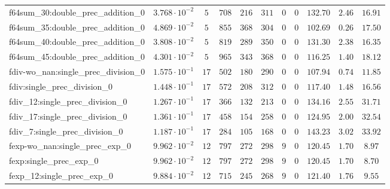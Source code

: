 \begin{tabular}{|l|c|c|c|c|c|c|c|c|c|c|}
f64sum\_30:double\_prec\_addition\_0           & $ 3.768 \cdot 10^{-2} $ & $ 5      $ & $ 708    $ & $ 216   $ & $ 311   $ & $ 0   $ & $ 0 $ & $ 132.70      $ & $ 2.46    $ & $ 16.91   $ \\
f64sum\_35:double\_prec\_addition\_0           & $ 4.869 \cdot 10^{-2} $ & $ 5      $ & $ 855    $ & $ 368   $ & $ 304   $ & $ 0   $ & $ 0 $ & $ 102.69      $ & $ 0.26    $ & $ 17.50   $ \\
f64sum\_40:double\_prec\_addition\_0           & $ 3.808 \cdot 10^{-2} $ & $ 5      $ & $ 819    $ & $ 289   $ & $ 350   $ & $ 0   $ & $ 0 $ & $ 131.30      $ & $ 2.38    $ & $ 16.35   $ \\
f64sum\_45:double\_prec\_addition\_0           & $ 4.301 \cdot 10^{-2} $ & $ 5      $ & $ 965    $ & $ 343   $ & $ 368   $ & $ 0   $ & $ 0 $ & $ 116.25      $ & $ 1.40    $ & $ 18.12   $ \\
fdiv-wo\_nan:single\_prec\_division\_0         & $ 1.575 \cdot 10^{-1} $ & $ 17     $ & $ 502    $ & $ 180   $ & $ 290   $ & $ 0   $ & $ 0 $ & $ 107.94      $ & $ 0.74    $ & $ 11.85   $ \\
fdiv:single\_prec\_division\_0                 & $ 1.448 \cdot 10^{-1} $ & $ 17     $ & $ 572    $ & $ 208   $ & $ 312   $ & $ 0   $ & $ 0 $ & $ 117.40      $ & $ 1.48    $ & $ 16.56   $ \\
fdiv\_12:single\_prec\_division\_0             & $ 1.267 \cdot 10^{-1} $ & $ 17     $ & $ 366    $ & $ 132   $ & $ 213   $ & $ 0   $ & $ 0 $ & $ 134.16      $ & $ 2.55    $ & $ 31.71   $ \\
fdiv\_17:single\_prec\_division\_0             & $ 1.361 \cdot 10^{-1} $ & $ 17     $ & $ 458    $ & $ 154   $ & $ 258   $ & $ 0   $ & $ 0 $ & $ 124.95      $ & $ 2.00    $ & $ 32.54   $ \\
fdiv\_7:single\_prec\_division\_0              & $ 1.187 \cdot 10^{-1} $ & $ 17     $ & $ 284    $ & $ 105   $ & $ 168   $ & $ 0   $ & $ 0 $ & $ 143.23      $ & $ 3.02    $ & $ 33.92   $ \\
fexp-wo\_nan:single\_prec\_exp\_0              & $ 9.962 \cdot 10^{-2} $ & $ 12     $ & $ 797    $ & $ 272   $ & $ 298   $ & $ 9   $ & $ 0 $ & $ 120.45      $ & $ 1.70    $ & $ 8.97    $ \\
fexp:single\_prec\_exp\_0                      & $ 9.962 \cdot 10^{-2} $ & $ 12     $ & $ 797    $ & $ 272   $ & $ 298   $ & $ 9   $ & $ 0 $ & $ 120.45      $ & $ 1.70    $ & $ 8.70    $ \\
fexp\_12:single\_prec\_exp\_0                  & $ 9.884 \cdot 10^{-2} $ & $ 12     $ & $ 715    $ & $ 245   $ & $ 268   $ & $ 9   $ & $ 0 $ & $ 121.40      $ & $ 1.76    $ & $ 9.55    $ \\

\end{tabular}
